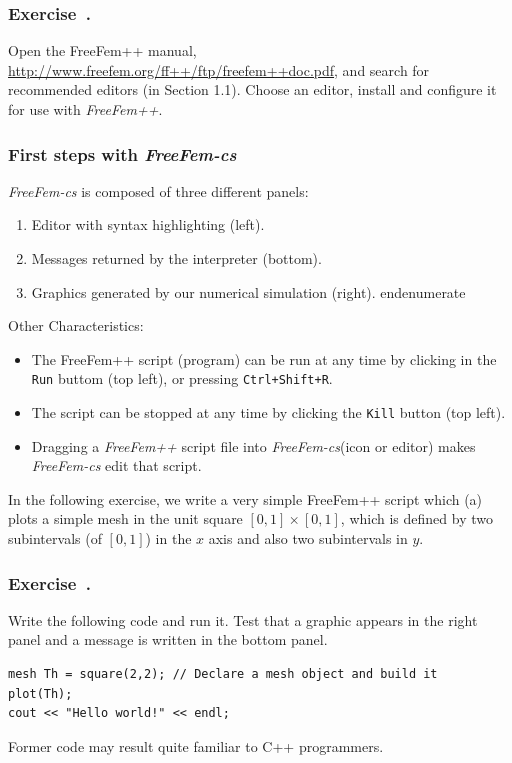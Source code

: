 \documentclass[12pt]{article}
\newcommand{\FF}{\textit{FreeFem++}\xspace}
\newcommand{\FFcs}{\textit{FreeFem-cs}\xspace}
\newcounter{exercise}
\newenvironment{exercise}{%
  \stepcounter{exercise}
  \subsubsection*{Exercise~\theexercise.}}
{}
\begin{document}
\begin{exercise}
  Open the FreeFem++ manual,
  \url{http://www.freefem.org/ff++/ftp/freefem++doc.pdf}, and search
  for recommended editors (in Section 1.1). Choose an editor, install
  and configure it for use with \FF.
\end{exercise}

\subsubsection{First steps with \FFcs}

\FFcs is composed of three different panels:
\begin{enumerate}
\item Editor with syntax highlighting (left).
\item Messages returned by the interpreter (bottom).
\item Graphics generated by our numerical simulation (right).
end{enumerate}
\end{enumerate}

Other Characteristics:

\begin{itemize}
\item The FreeFem++ script (program) can be run at any time by
  clicking in the \texttt{Run} buttom (top left), or pressing
  \texttt{Ctrl+Shift+R}.
\item The script can be stopped at any time by clicking the
  \texttt{Kill} button (top left).
\item Dragging a \FF script file into \FFcs (icon or editor) makes \FFcs
  edit that script.
\end{itemize}

In the following exercise, we write a very simple FreeFem++ script
which (a) plots a simple mesh in the unit square
$[0,1]\times[0,1]$, which is defined by two subintervals (of $[0,1]$)
in the $x$ axis and also two subintervals in $y$.
\begin{exercise}
  Write the following code and run it. Test that a graphic appears in the
  right panel and a message is written in the bottom panel.
\begin{lstlisting}
mesh Th = square(2,2); // Declare a mesh object and build it
plot(Th);
cout << "Hello world!" << endl;
\end{lstlisting}
\end{exercise}

Former code may result quite familiar to C++ programmers.
\end{document}

